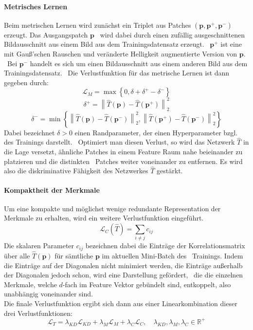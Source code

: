 \paragraph*{Metrisches Lernen}\label{par:metrischeslernen}
Beim metrischen Lernen wird zunächst ein Triplet aus Patches $(\mathbf{p}, \mathbf{p}^{+}, \mathbf{p}^{-})$ erzeugt. Das Ausgangspatch $\mathbf{p}$ \
wird dabei durch einen zufällig ausgeschnittenen Bildausschnitt aus einem Bild aus dem Trainingsdatensatz erzeugt. \
$\mathbf{p}^{+}$ ist eine mit Gauß'schen Rauschen und veränderte Helligkeit augmentierte Version von $\mathbf{p}$. \
Bei $\mathbf{p}^{-}$ handelt es sich um einen Bildausschnitt aus einem anderen Bild aus dem Trainingsdatensatz. \
Die Verlustfunktion für das metrische Lernen ist dann gegeben durch: \
$$
\mathcal{L}_{M} = \max\left\{0,  \delta + \delta^{+}-\delta^{-}\right\}
$$
$$
\delta^{+}=\left\lVert \hat{T}(\mathbf{p})-\hat{T}(\mathbf{p}^{+}) \right\rVert_{2}^{2}
$$
$$
\delta^{-}=\min\left\{\left\lVert \hat{T}(\mathbf{p})-\hat{T}(\mathbf{p}^{-}) \right\rVert_{2}^{2}, \left\lVert \hat{T}(\mathbf{p}^{+})-\hat{T}(\mathbf{p}^{-}) \right\rVert_{2}^{2} \right\}
$$
Dabei bezeichnet $\delta>0$ einen Randparameter, der einen Hyperparameter bzgl. des Trainings darstellt. \
Optimiert man diesen Verlust, so wird das Netzwerk $\hat{T}$ in die Lage versetzt, ähnliche Patches in einem Feature Raum nahe beieinander zu platzieren und die distinkten \
Patches weiter voneinander zu entfernen. Es wird also die diskriminative Fähigkeit des Netzwerkes $\hat{T}$ gestärkt. \
\paragraph*{Kompaktheit der Merkmale}\label{par:kompaktheitdermerkmale}
Um eine kompakte und möglichst wenige redundante Representation der Merkmale zu erhalten, wird ein weitere Verlustfunktion eingeführt. \
$$
\mathcal{L}_{C}\left(\hat{T}\right) = \sum_{i\neq j} c_{ij} 
$$
Die skalaren Parameter $c_{ij}$ bezeichnen dabei die Einträge der Korrelationsmatrix über alle $\hat{T}\left(\mathbf{p}\right)$ für sämtliche $\mathbf{p}$ im aktuellen Mini-Batch des \
Trainings. Indem die Einträge auf der Diagonalen nicht minimiert werden, die Einträge außerhalb der Diagonalen jedoch schon, wird eine Darstellung gefördert, \
die die einzelnen Merkmale, welche $d$-fach im Feature Vektor gebündelt sind, entkoppelt, also unabhängig voneinander sind. \\
Die finale Verlustfunktion ergibt sich dann aus einer Linearkombination dieser drei Verlustfunktionen: \
$$
\mathcal{L}_{T} = \lambda_{KD}\mathcal{L}_{KD} + \lambda_{M}\mathcal{L}_{M} + \lambda_{C}\mathcal{L}_{C}, \quad \lambda_{KD}, \lambda_{M}, \lambda_{C} \in \mathbb{R}^{+}
$$

